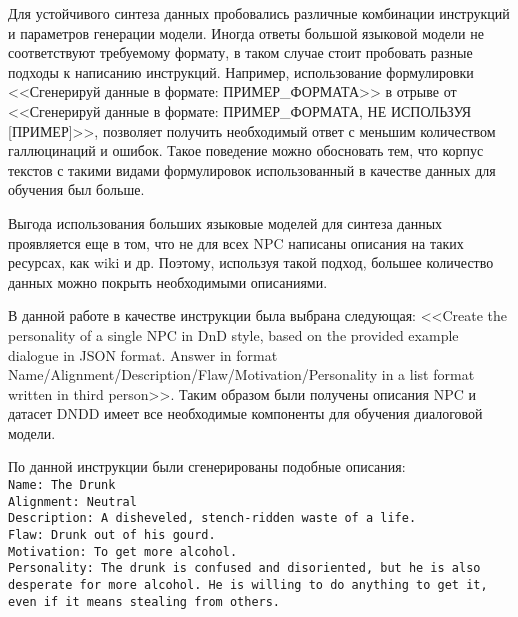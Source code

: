 Для устойчивого синтеза данных пробовались различные комбинации инструкций и параметров генерации модели. Иногда ответы большой языковой модели не соответствуют требуемому формату, в таком случае стоит пробовать разные подходы к написанию инструкций. Например, использование формулировки <<Сгенерируй данные в формате: ПРИМЕР\_ФОРМАТА>> в отрыве от <<Сгенерируй данные в формате: ПРИМЕР\_ФОРМАТА, НЕ ИСПОЛЬЗУЯ [ПРИМЕР]>>, позволяет получить необходимый ответ с меньшим количеством галлюцинаций и ошибок. Такое поведение можно обосновать тем, что корпус текстов с такими видами формулировок использованный в качестве данных для обучения был больше.

Выгода использования больших языковые моделей для синтеза данных проявляется еще в том, что не для всех NPC написаны описания на таких ресурсах, как wiki и др. Поэтому, используя такой подход, большее количество данных можно покрыть необходимыми описаниями.

В данной работе в качестве инструкции была выбрана следующая: <<Create the personality of a single NPC in DnD style, based on the provided example dialogue in JSON format. Answer in format Name/Alignment/Description/Flaw/Motivation/Personality in a list format written in third person>>. Таким образом были получены описания NPC и датасет DNDD имеет все необходимые компоненты для обучения диалоговой модели.

По данной инструкции были сгенерированы подобные описания: \texttt{\\Name: The Drunk\\
  Alignment: Neutral\\
  Description: A disheveled, stench-ridden waste of a life.\\
  Flaw: Drunk out of his gourd.\\
  Motivation: To get more alcohol.\\
  Personality: The drunk is confused and disoriented, but he is also desperate for more alcohol. He is willing to do anything to get it, even if it means stealing from others.}

